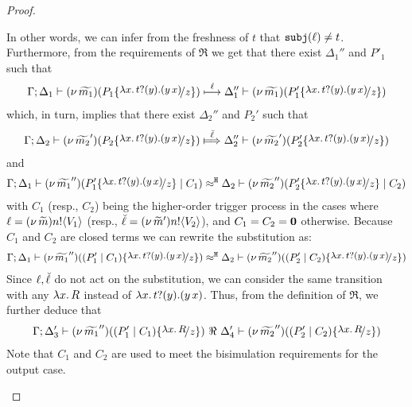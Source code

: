 \begin{proof}
\begin{enumerate}
				In other words, we can infer from the freshness of $t$ that $\mathtt{subj}(\ell) \not= t$.
				Furthermore, from the requirements of $\Re$
				we get that there exist $\Delta_1''$ and $P'_1$ such that
				\begin{eqnarray*}
					\horel{\Gamma}{\Delta_1}{\newsp{\widetilde{m_1}}{P_1 \subst{\trvalx{t}}{z} }}
					{\hby{\ell}}
					{\Delta_1''}{\newsp{\widetilde{m_1}}{P_1' \subst{\trvalx{t}}{z} }}
				\end{eqnarray*}
				which, in turn, implies that there exist $\Delta_2''$ and $P_2'$ such that
				\begin{eqnarray}
					\horel{\Gamma}{\Delta_2}{\newsp{\widetilde{m_2}'}{P_2 \subst{\trvalx{t}}{z} }}
					{\Hby{\mact{\ell}}}
					{\Delta_2''}{\newsp{\widetilde{m_2}'}{P_2' \subst{\trvalx{t}}{z} }}
					\label{lem:proc_subst0}
				\end{eqnarray}
				and
				\begin{eqnarray*}
					\horel{\Gamma}{\Delta_1}{\newsp{\widetilde{m_1}''}{P_1' \subst{\trvalx{t}}{z} \Par C_1}}
					{\hwb}
					{\Delta_2}{\newsp{\widetilde{m_2}''}{P_2' \subst{\trvalx{t}}{z} \Par C_2}}
				\end{eqnarray*}
				with $C_1$ (resp., $C_2$) being the higher-order trigger process
				in the cases where $\ell = (\nu\, \widetilde{m}) n ! \langle V_1 \rangle$ (resp., $\breve{\ell} = (\nu\, \widetilde{m}') n ! \langle V_2 \rangle$),
				and $C_1 = C_2 = \mathbf{0}$ otherwise.
				Because $C_1$ and $C_2$ are closed terms we can rewrite the substitution as:
				\begin{eqnarray*}
					\horel{\Gamma}{\Delta_1}{\newsp{\widetilde{m_1}''}{(P_1'\Par C_1) \subst{\trvalx{t}}{z}}}
					{\hwb}
					{\Delta_2}{\newsp{\widetilde{m_2}''}{(P_2'\Par C_2) \subst{\trvalx{t}}{z}}}
				\end{eqnarray*}
				Since $\ell, \breve{\ell}$ do not act on the substitution,
				we can consider the same transition with any $\lambda x.\,R$ instead of $\lambda x.\,t ? (y) . (y\, {x})$.
				Thus, from the definition of $\Re$, we further deduce that
				\begin{eqnarray}
					\horel{\Gamma}{\Delta_3'}{\newsp{\widetilde{m_1}''}{(P_1'\Par C_1) \subst{{\abs{x}{R}}}{z}}}
					{\ \Re\ }
					{\Delta_4'}{\newsp{\widetilde{m_2}''}{(P_2'\Par C_2) \subst{{\abs{x}{R}}}{z}}}
					\label{lem:proc_subst33}
				\end{eqnarray}
				Note that $C_1$ and $C_2$ are used to meet the bisimulation
				requirements for the output case.


\end{enumerate}
\end{proof}
